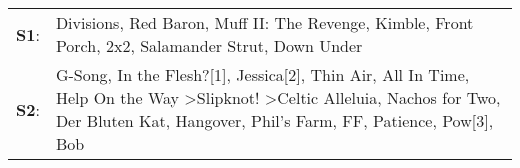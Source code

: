 \begin{supertabular}{p{0.03\textwidth}p{0.92\textwidth}}
 \textbf{S1}:  &                                                                                                                                                                                                                                                                                                                                          Divisions\textsuperscript{}, \enspace Red Baron\textsuperscript{}, \enspace Muff II: The Revenge\textsuperscript{}, \enspace Kimble\textsuperscript{}, \enspace Front Porch\textsuperscript{}, \enspace 2x2\textsuperscript{}, \enspace Salamander Strut\textsuperscript{}, \enspace Down Under\textsuperscript{}  \enspace  \\
 \textbf{S2}:  &  G-Song\textsuperscript{}, \enspace In the Flesh?[1]\textsuperscript{}, \enspace Jessica[2]\textsuperscript{}, \enspace Thin Air\textsuperscript{}, \enspace All In Time\textsuperscript{}, \enspace Help On the Way\textsuperscript{} \textgreater \enspace Slipknot!\textsuperscript{} \textgreater \enspace Celtic Alleluia\textsuperscript{}, \enspace Nachos for Two\textsuperscript{}, \enspace Der Bluten Kat\textsuperscript{}, \enspace Hangover\textsuperscript{}, \enspace Phil's Farm\textsuperscript{}, \enspace FF\textsuperscript{}, \enspace Patience\textsuperscript{}, \enspace Pow[3]\textsuperscript{}, \enspace Bob\textsuperscript{}  \enspace  \\
\end{supertabular}
